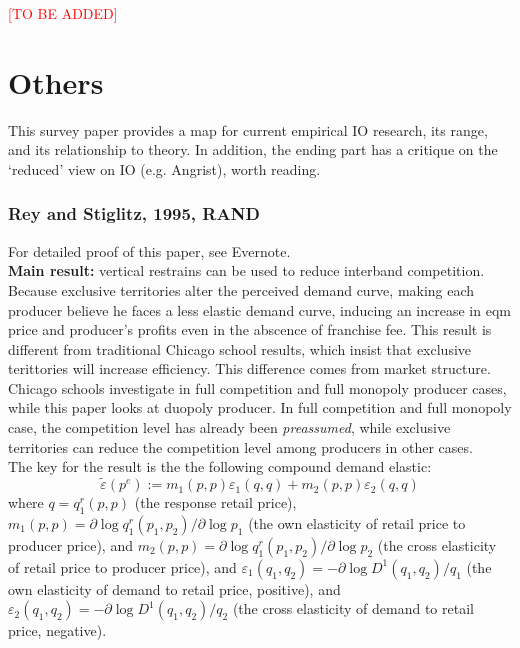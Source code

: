 \documentclass{book}
\theoremstyle{plain}
\theoremstyle{definition}
\begin{document}
\textcolor{red}{[TO BE ADDED]}



\chapter{Others} %
\label{cha:others}

\textbf{}

This survey paper provides a map for current empirical IO research, its range, and its relationship to theory.
In addition, the ending part has a critique on the `reduced' view on IO (e.g. Angrist), worth reading.


\subsection{Rey and Stiglitz, 1995, RAND} %
\label{subsec:rey_and_stiglitz_1995_rand}

\textbf{}

For detailed proof of this paper, see Evernote.\\

\textbf{Main result:}
vertical restrains can be used to reduce interband competition. Because exclusive territories alter the perceived demand curve, making each producer believe he faces a less elastic demand curve, inducing an increase in eqm price and producer's profits even in the abscence of franchise fee. This result is different from traditional Chicago school results, which insist that exclusive terittories will increase efficiency. This difference comes from market structure. Chicago schools investigate in full competition and full monopoly producer cases, while this paper looks at duopoly producer. In full competition and full monopoly case, the competition level has already been \textit{preassumed}, while exclusive territories can reduce the competition level among producers in other cases.\\

The key for the result is the the following compound demand elastic:
\[\tilde\varepsilon(p^e):=m_1(p,p)\varepsilon_1(q,q)+m_2(p,p)\varepsilon_2(q,q) \]
where $q=q_1^r(p,p)$ (the response retail price),
$m_1(p,p)=\partial \log q_1^r(p_1,p_2)/\partial \log p_1$ (the own elasticity of retail price to producer price),
and  $m_2(p,p)=\partial \log q_1^r(p_1,p_2)/\partial \log p_2$ (the cross elasticity of retail price to producer price),
and $\varepsilon_1(q_1,q_2)=-\partial \log D^1(q_1,q_2)/q_1$ (the own elasticity of demand to retail price, positive),
and $\varepsilon_2(q_1,q_2)=-\partial \log D^1(q_1,q_2)/q_2$ (the cross elasticity of demand to retail price, negative).
\end{document}
